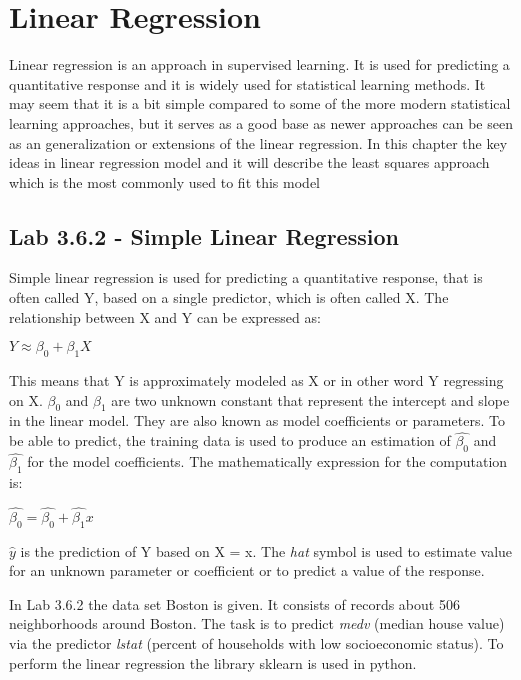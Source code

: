 \chapter{Linear Regression}
\label{chp:linreg}

Linear regression is an approach in supervised learning. It is used for predicting a quantitative response and it is widely used for statistical learning methods. It may seem that it is a bit simple compared to some of the more modern statistical learning approaches, but it serves as a good base as newer approaches can be seen as an generalization or extensions of the linear regression. 
In this chapter the key ideas in linear regression model and it will describe the least squares approach
which is the most commonly used to fit this model

\section{Lab 3.6.2 - Simple Linear Regression}

Simple linear regression is used for predicting a quantitative response, that is often called Y, based on a single predictor, which is often called X.
The relationship between X and Y can be expressed as:

\begin{center}
	$Y \approx \beta_0 + \beta_1X$
\end{center}

This means that Y is approximately modeled as X or in other word Y regressing on X. 
$\beta_0$ and $\beta_1$ are two unknown constant that represent the intercept and slope in the linear model. They are also known as model coefficients or parameters. 
To be able to predict, the training data is used to produce
an estimation of $\hat{\beta_0}$ and $\hat{\beta_1}$ for the model coefficients. 
The mathematically expression for the computation is:

\begin{center}
	$\hat{\beta_0} = \hat{\beta_0} + \hat{\beta_1}x$
\end{center}

$\hat{y}$ is the prediction of Y based on X = x. The \textit{hat} symbol is used to estimate value for an unknown parameter or coefficient or to predict a value of the response.

In Lab 3.6.2 the data set Boston is given. It consists of records about 506 neighborhoods around Boston. The task is to predict \emph{medv} (median house  value) via the predictor \emph{lstat} (percent of households with low socioeconomic status).
To perform the linear regression the library sklearn is used in python. 

